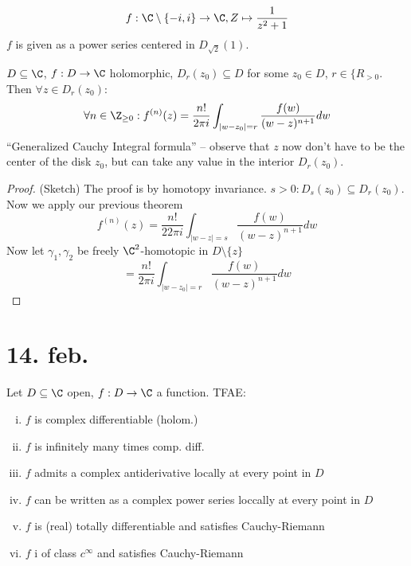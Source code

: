 \begin{example}
  $$f: \C \setminus\{-i,i\} \to \C, Z \mapsto \frac{1}{z^2+1}$$
  $f$ is given as a power series centered in $D_{\sqrt{2}}(1)$.
\end{example}

\begin{remark}
    $D \subseteq \C$, $f: D\to \C$ holomorphic, $D_r(z_0)\subseteq D$ for some $z_0 \in D$, $r\in \{R_{>0}$. Then $\forall z \in D_r(z_0)$:
      $$\forall n \in \Z_{\geq 0}: f^{(n)}(z)=\frac{n!}{2\pi i} \int_{|w-z_0|=r}\frac{f(w)}{(w-z)^{n+1}}dw$$
    ``Generalized Cauchy Integral formula'' -- observe that $z$ now don't have to be the center of the disk $z_0$, but can take any value in the interior $D_r(z_0)$.
\end{remark}
\begin{proof}
  (Sketch)
  \newline The proof is by homotopy invariance. $s>0: D_s(z_0)\subseteq D_r(z_0)$. Now we apply our previous theorem
    $$f^{(n)}(z)=\frac{n!}{22 \pi i} \int_{|w-z| = s }\frac{f(w)}{(w-z)^{n+1}} dw$$
  Now let $\gamma_1, \gamma_2$ be freely $\C^2$-homotopic in $D\setminus \{z\}$
    $$=\frac{n!}{2\pi i}\int_{|w-z_0|=r}\frac{f(w)}{(w-z)^{n+1}}dw$$
\end{proof}

\section{14. feb.}
\begin{corollary}
  Let $D \subseteq \C$ open, $f:D\to \C$ a function. TFAE:
    \begin{enumerate}[(i)]
      \item $f$ is complex differentiable (holom.)
      \item $f$ is infinitely many times comp. diff.
      \item $f$ admits a complex antiderivative locally at every point in $D$
      \item $f$ can be written as a complex power series loccally at every point in $D$
      \item $f$ is (real) totally differentiable and satisfies Cauchy-Riemann
      \item $f$ i of class $c^{\infty}$ and satisfies Cauchy-Riemann
    \end{enumerate}
\end{corollary}

